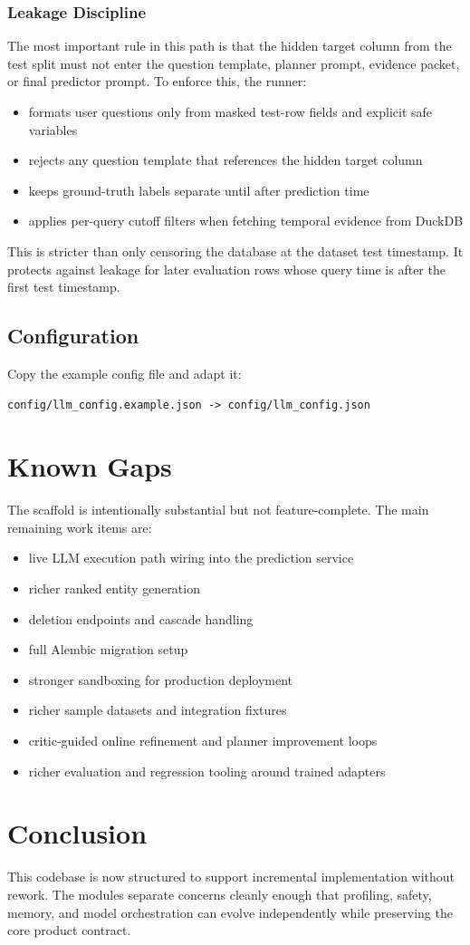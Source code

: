 \documentclass[11pt]{book}
\begin{document}
\subsection*{Leakage Discipline}
The most important rule in this path is that the hidden target column from the test split must not
enter the question template, planner prompt, evidence packet, or final predictor prompt. To
enforce this, the runner:

\begin{itemize}
\item formats user questions only from masked test-row fields and explicit safe variables
\item rejects any question template that references the hidden target column
\item keeps ground-truth labels separate until after prediction time
\item applies per-query cutoff filters when fetching temporal evidence from DuckDB
\end{itemize}

This is stricter than only censoring the database at the dataset test timestamp. It protects
against leakage for later evaluation rows whose query time is after the first test timestamp.

\section{Configuration}
Copy the example config file and adapt it:

\begin{lstlisting}[style=code]
config/llm_config.example.json -> config/llm_config.json
\end{lstlisting}

\chapter{Known Gaps}
The scaffold is intentionally substantial but not feature-complete. The main remaining work items
are:

\begin{itemize}
\item live LLM execution path wiring into the prediction service
\item richer ranked entity generation
\item deletion endpoints and cascade handling
\item full Alembic migration setup
\item stronger sandboxing for production deployment
\item richer sample datasets and integration fixtures
\item critic-guided online refinement and planner improvement loops
\item richer evaluation and regression tooling around trained adapters
\end{itemize}

\chapter{Conclusion}
This codebase is now structured to support incremental implementation without rework. The modules
separate concerns cleanly enough that profiling, safety, memory, and model orchestration can evolve
independently while preserving the core product contract.
\end{document}
